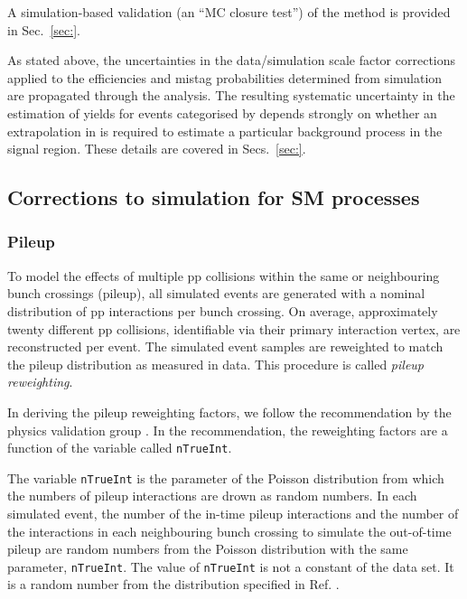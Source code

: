 
A simulation-based validation (\ie an ``MC closure test'') of the
method is provided in Sec.~\ref{sec:}.

As stated above, the uncertainties in the data/simulation scale factor
corrections applied to the efficiencies and mistag probabilities
determined from simulation are propagated through the analysis. The
resulting systematic uncertainty in the estimation of yields for
events categorised by \nb depends strongly on whether an extrapolation
in \nb is required to estimate a particular background process in the
signal region. These details are covered in Secs.~\ref{sec:}. 

\subsection{Corrections to simulation for SM processes}
\label{sec:sim-corrs}

\subsubsection{Pileup}
\label{sec:pileup-reweighting}

To model the effects of multiple pp collisions within the same or
neighbouring bunch crossings (pileup), all simulated events are
generated with a nominal distribution of pp interactions per bunch
crossing. On average, approximately twenty different pp collisions,
identifiable via their primary interaction vertex, are reconstructed
per event. The simulated event samples are reweighted to match the
pileup distribution as measured in data. This procedure is called
\textit{pileup reweighting}.

In deriving the pileup reweighting factors, we follow the
recommendation by the physics validation group
\cite{twiki-PdmVPileUpDescription, twiki-PileupJSONFileforData}. In
the recommendation, the reweighting factors are a function of the
variable called \verb!nTrueInt!.

The variable \verb!nTrueInt! is the parameter of the Poisson
distribution from which the numbers of pileup interactions are drown
as random numbers. In each simulated event, the number of the in-time
pileup interactions and the number of the interactions in each
neighbouring bunch crossing to simulate the out-of-time pileup are
random numbers from the Poisson distribution with the same parameter,
\verb!nTrueInt!. The value of \verb!nTrueInt! is not a constant of the
data set. It is a random number from the distribution specified in
Ref. \cite{github-mix_2016_25ns_SpringMC_PUScenarioV1_PoissonOOTPU_cfi}.

